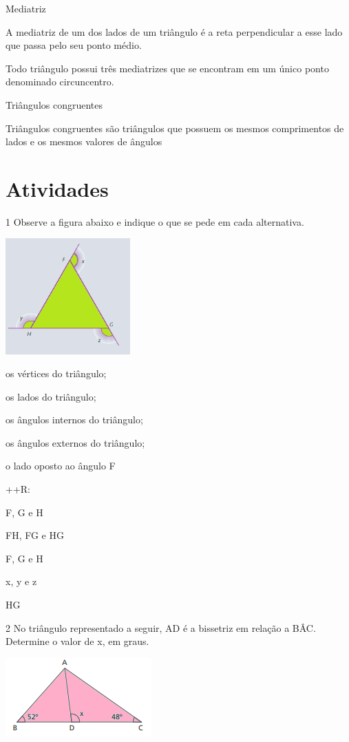 {Mediatriz

A mediatriz de um dos lados de um triângulo é a reta perpendicular a
esse lado que passa pelo seu ponto médio.

Todo triângulo possui três mediatrizes que se encontram em um único
ponto denominado circuncentro.

Triângulos congruentes

Triângulos congruentes são triângulos que possuem os mesmos comprimentos
de lados e os mesmos valores de ângulos

\section{Atividades}

\num{1} Observe a figura abaixo e indique o que se pede em cada alternativa.

\includegraphics[width=1.88333in,height=1.75048in]{./imgSAEB_8_MAT/media/image13.png}
\item os vértices do triângulo;
\item os lados do triângulo;
\item os ângulos internos do triângulo;
\item os ângulos externos do triângulo;
\item o lado oposto ao ângulo F

++R:
\item F, G e H
\item FH, FG e HG
\item F, G e H
\item x, y e z
\item HG

\num{2} No triângulo representado a seguir, AD é a bissetriz em relação a
BÂC. Determine o valor de x, em graus.

\includegraphics[width=2.20833in,height=1.1875in]{./imgSAEB_8_MAT/media/image14.png}

}
